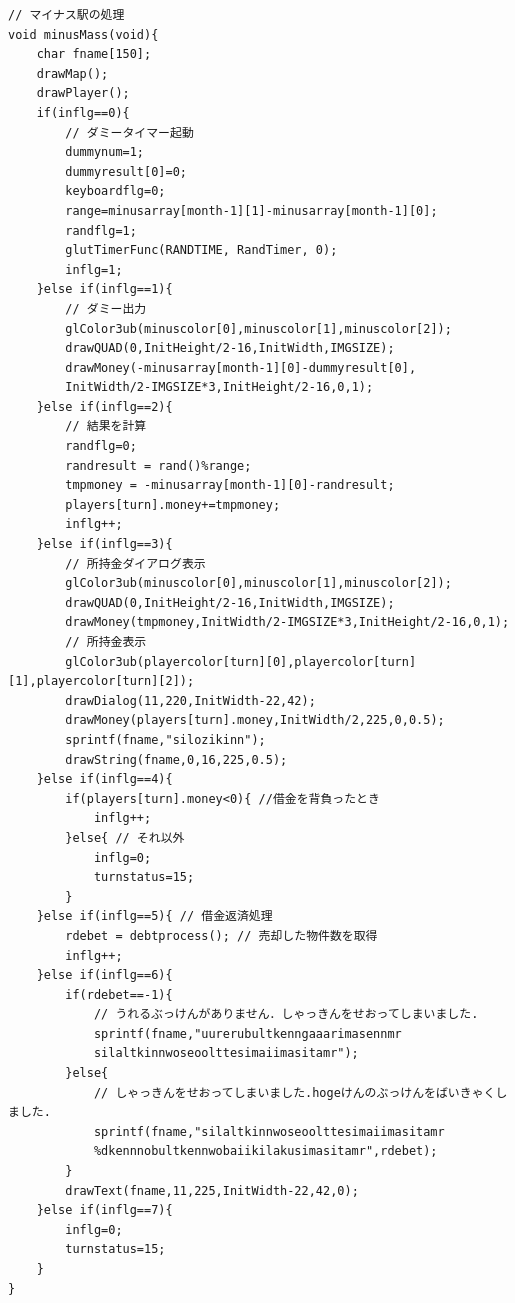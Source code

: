 \documentclass[a4j]{jarticle}
\begin{document}
\begin{lstlisting}[basicstyle=\ttfamily\footnotesize, frame=single,label=minusMass,caption=minusMass関数]
// マイナス駅の処理
void minusMass(void){
    char fname[150];
    drawMap();
    drawPlayer(); 
    if(inflg==0){
        // ダミータイマー起動
        dummynum=1;
        dummyresult[0]=0;
        keyboardflg=0;
        range=minusarray[month-1][1]-minusarray[month-1][0];
        randflg=1;
        glutTimerFunc(RANDTIME, RandTimer, 0);
        inflg=1;            
    }else if(inflg==1){
        // ダミー出力
        glColor3ub(minuscolor[0],minuscolor[1],minuscolor[2]);
        drawQUAD(0,InitHeight/2-16,InitWidth,IMGSIZE);
        drawMoney(-minusarray[month-1][0]-dummyresult[0],
        InitWidth/2-IMGSIZE*3,InitHeight/2-16,0,1);            
    }else if(inflg==2){
        // 結果を計算
        randflg=0;
        randresult = rand()%range;
        tmpmoney = -minusarray[month-1][0]-randresult;
        players[turn].money+=tmpmoney;
        inflg++;
    }else if(inflg==3){
        // 所持金ダイアログ表示
        glColor3ub(minuscolor[0],minuscolor[1],minuscolor[2]);
        drawQUAD(0,InitHeight/2-16,InitWidth,IMGSIZE);
        drawMoney(tmpmoney,InitWidth/2-IMGSIZE*3,InitHeight/2-16,0,1);
        // 所持金表示
        glColor3ub(playercolor[turn][0],playercolor[turn][1],playercolor[turn][2]);
        drawDialog(11,220,InitWidth-22,42);
        drawMoney(players[turn].money,InitWidth/2,225,0,0.5);
        sprintf(fname,"silozikinn");
        drawString(fname,0,16,225,0.5);               
    }else if(inflg==4){
        if(players[turn].money<0){ //借金を背負ったとき
            inflg++;
        }else{ // それ以外
            inflg=0;
            turnstatus=15;
        }
    }else if(inflg==5){ // 借金返済処理
        rdebet = debtprocess(); // 売却した物件数を取得
        inflg++;
    }else if(inflg==6){
        if(rdebet==-1){
            // うれるぶっけんがありません．しゃっきんをせおってしまいました.
            sprintf(fname,"uurerubultkenngaaarimasennmr
            silaltkinnwoseoolttesimaiimasitamr");
        }else{
            // しゃっきんをせおってしまいました.hogeけんのぶっけんをばいきゃくしました.
            sprintf(fname,"silaltkinnwoseoolttesimaiimasitamr
            %dkennnobultkennwobaiikilakusimasitamr",rdebet);
        }
        drawText(fname,11,225,InitWidth-22,42,0); 
    }else if(inflg==7){
        inflg=0;
        turnstatus=15;
    }
}
        \end{lstlisting}
\end{document}
